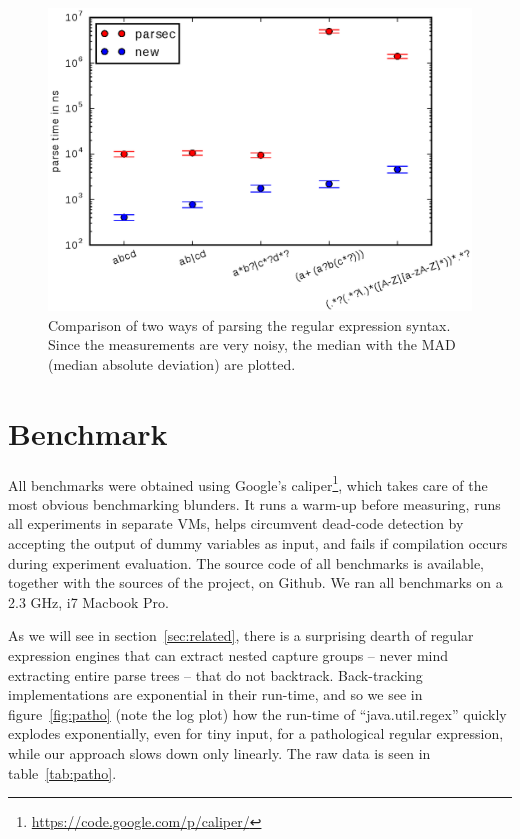 \documentclass[11pt]{Thesis}
\theoremstyle{definition}
\newcommand{\Figref}[1]{figure~\ref{fig:#1}}
\newcommand{\Secref}[1]{section~\ref{sec:#1}}
\newcommand{\Tabref}[1]{table~\ref{tab:#1}}
\newcommand{\figlabel}[1]{\label{fig:#1}}
\newcommand{\seclabel}[1]{\label{sec:#1}}
\begin{document}
\begin{figure}
  \includegraphics[width=\linewidth]{graphs/logplot-parserspeed-robust}

  \caption{\figlabel{regex-syntax-parsing}Comparison of two ways of parsing the
regular expression syntax. Since the measurements are very noisy, the median 
with the MAD (median absolute deviation) are plotted.}
\end{figure}

\chapter{Benchmark}
\seclabel{benchmarks}
All benchmarks were obtained using Google's
caliper\footnote{\url{https://code.google.com/p/caliper/}}, which
takes care of the most obvious benchmarking blunders.  It runs a
warm-up before measuring, runs all experiments in separate VMs,
helps circumvent dead-code detection by accepting the output of
dummy variables as input, and fails if compilation occurs during
experiment evaluation.  The source code of all benchmarks is
available, together with the sources of the project, on Github. We
ran all benchmarks on a 2.3 GHz, i7 Macbook Pro.

As we will see in \Secref{related}, there is a surprising dearth
of regular expression engines that can extract nested capture groups
-- never mind extracting entire parse trees -- that do not backtrack.
Back-tracking implementations are exponential in their run-time,
and so we see in \Figref{patho} (note the log plot) how the run-time
of ``java.util.regex'' quickly explodes exponentially, even for tiny input, for
a pathological regular expression, while our approach slows down
only linearly. The raw data is seen in \Tabref{patho}.
\end{document}
